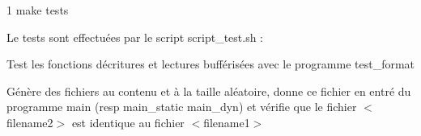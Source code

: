 \begin{DoxyCode}
1 make tests
\end{DoxyCode}


Le tests sont effectuées par le script script\+\_\+test.\+sh \+:
\begin{DoxyItemize}
\item Test les fonctions d\textquotesingle{}écritures et lectures bufférisées avec le programme test\+\_\+format
\item Génère des fichiers au contenu et à la taille aléatoire, donne ce fichier en entré du programme main (resp main\+\_\+static main\+\_\+dyn) et vérifie que le fichier $<$filename2$>$ est identique au fichier $<$filename1$>$ 
\end{DoxyItemize}